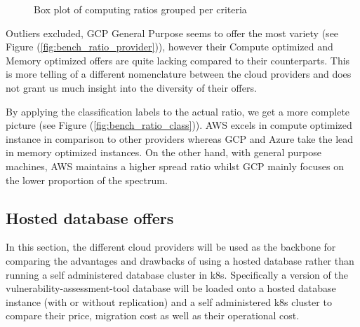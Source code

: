 \documentclass[11pt]{article}
\begin{document}
\begin{figure}[h]

\caption{Box plot of computing ratios grouped per criteria}
\end{figure}

Outliers excluded, GCP General Purpose seems to offer the most variety (see Figure (\ref{fig:bench_ratio_provider})), however their Compute optimized and Memory optimized offers are quite lacking compared to their counterparts. This is more telling of a different nomenclature between the cloud providers and does not grant us much insight into the diversity of their offers.

By applying the classification labels to the actual ratio, we get a more complete picture (see Figure (\ref{fig:bench_ratio_class})). AWS excels in compute optimized instance in comparison to other providers whereas GCP and Azure take the lead in memory optimized instances. On the other hand, with general purpose machines, AWS maintains a higher spread ratio whilst GCP mainly focuses on the lower proportion of the spectrum.

\subsection{Hosted database offers}

\hspace{5mm} In this section, the different cloud providers will be used as the backbone for comparing the advantages and drawbacks of using a hosted database rather than running a self administered database cluster in k8s. Specifically a version of the vulnerability-assessment-tool database will be loaded onto a hosted database instance (with or without replication) and a self administered k8s cluster to compare their price, migration cost as well as their operational cost.
\end{document}
